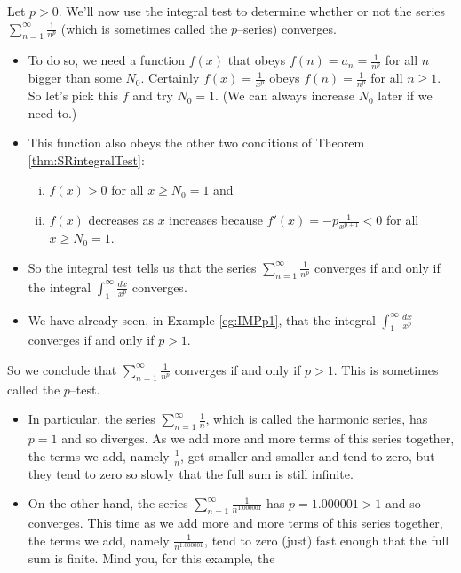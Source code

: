 \begin{eg}[The $p$ test:  $\sum\limits_{n=1}^\infty\frac{1}{n^p}$]
                                                    \label{eg:SRpTest}
Let $p>0$. We'll now use the integral test to determine whether or not the
series $\sum_{n=1}^\infty\frac{1}{n^p}$ (which is sometimes called
the $p$--series) converges.
\begin{itemize}
\item To do so, we
need a function $f(x)$ that obeys $f(n)=a_n=\frac{1}{n^p}$ for all $n$
bigger than some $N_0$. Certainly $f(x)=\frac{1}{x^p}$ obeys
$f(n)=\frac{1}{n^p}$ for all $n\ge 1$. So let's pick this $f$ and try $N_0=1$.
(We can always increase $N_0$ later if we need to.)
\item
This function also obeys the other two conditions of
Theorem \ref{thm:SRintegralTest}:
\begin{enumerate}[(i)]
\item $f(x)>0$ for all $x\ge N_0=1$ and
\item $f(x)$ decreases as $x$ increases because $f'(x)=-p\frac{1}{x^{p+1}}<0$
for all $x\ge N_0=1$.
\end{enumerate}
\item
So the integral test tells us that the series
$\sum_{n=1}^\infty\frac{1}{n^p}$ converges if and only if the integral
$\int_1^\infty\frac{dx}{x^p}$ converges.
\item
We have already seen, in Example \ref{eg:IMPp1}, that
the integral $\int_1^\infty\frac{dx}{x^p}$ converges if and only if $p>1$.
\end{itemize}
So we conclude that $\sum_{n=1}^\infty\frac{1}{n^p}$ converges if
and only if $p>1$. This is sometimes called the $p$--test.
\begin{itemize}
\item
In particular, the series $\sum_{n=1}^\infty\frac{1}{n}$,
which is called the harmonic series, has $p=1$ and so diverges.
As we add more and more terms of this series together, the terms we add,
namely $\frac{1}{n}$, get smaller and smaller and tend to zero,
but they tend to zero so slowly
that the full sum is still infinite.
\item
On the other hand, the series $\sum_{n=1}^\infty\frac{1}{n^{1.000001}}$ has
$p = 1.000001>1$ and so converges. This time as we add more and more
terms of this series together, the terms we add, namely
$\frac{1}{n^{1.000001}}$, tend to zero (just) fast enough that
the full sum is finite. Mind you, for this example, the

\end{itemize}
\end{eg}
